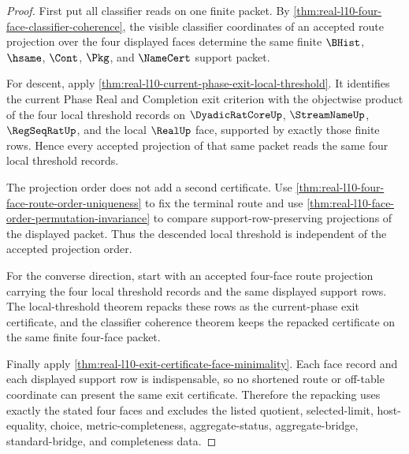 \begin{proof}
First put all classifier reads on one finite packet. By \autoref{thm:real-l10-four-face-classifier-coherence}, the visible classifier coordinates of an accepted route projection over the four displayed faces determine the same finite $\BHist$, $\hsame$, $\Cont$, $\Pkg$, and $\NameCert$ support packet.

For descent, apply \autoref{thm:real-l10-current-phase-exit-local-threshold}. It identifies the current Phase Real and Completion exit criterion with the objectwise product of the four local threshold records on $\DyadicRatCoreUp$, $\StreamNameUp$, $\RegSeqRatUp$, and the local $\RealUp$ face, supported by exactly those finite rows. Hence every accepted projection of that same packet reads the same four local threshold records.

The projection order does not add a second certificate. Use \autoref{thm:real-l10-four-face-route-order-uniqueness} to fix the terminal route and use \autoref{thm:real-l10-face-order-permutation-invariance} to compare support-row-preserving projections of the displayed packet. Thus the descended local threshold is independent of the accepted projection order.

For the converse direction, start with an accepted four-face route projection carrying the four local threshold records and the same displayed support rows. The local-threshold theorem repacks these rows as the current-phase exit certificate, and the classifier coherence theorem keeps the repacked certificate on the same finite four-face packet.

Finally apply \autoref{thm:real-l10-exit-certificate-face-minimality}. Each face record and each displayed support row is indispensable, so no shortened route or off-table coordinate can present the same exit certificate. Therefore the repacking uses exactly the stated four faces and excludes the listed quotient, selected-limit, host-equality, choice, metric-completeness, aggregate-status, aggregate-bridge, standard-bridge, and completeness data.
\end{proof}


